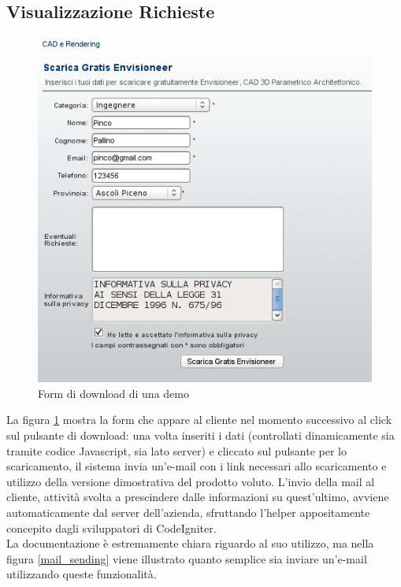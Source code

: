 \subsection{Visualizzazione Richieste}
\begin{figure}[!ht]
\centering
  \includegraphics[scale=0.75]{./images/downloadScreen.png}
\caption{Form di download di una demo}
\label{form_download}
\end{figure}

\noindent
La figura \ref{form_download} mostra la form che appare al cliente nel momento successivo al click sul pulsante di download: una volta inseriti i dati (controllati dinamicamente sia tramite codice Javascript, sia lato server) e cliccato sul pulsante per lo scaricamento, il sistema invia un'e-mail con i link necessari allo scaricamento e utilizzo della versione dimostrativa del prodotto voluto.
L'invio della mail al cliente, attivit\`a svolta a prescindere dalle informazioni su quest'ultimo, avviene automaticamente dal server dell'azienda, sfruttando l'helper appositamente concepito dagli sviluppatori di CodeIgniter. \\
La documentazione \`e estremamente chiara riguardo al suo utilizzo, ma nella figura \ref{mail_sending} viene illustrato quanto semplice sia inviare un'e-mail utilizzando queste funzionalit\`a.


